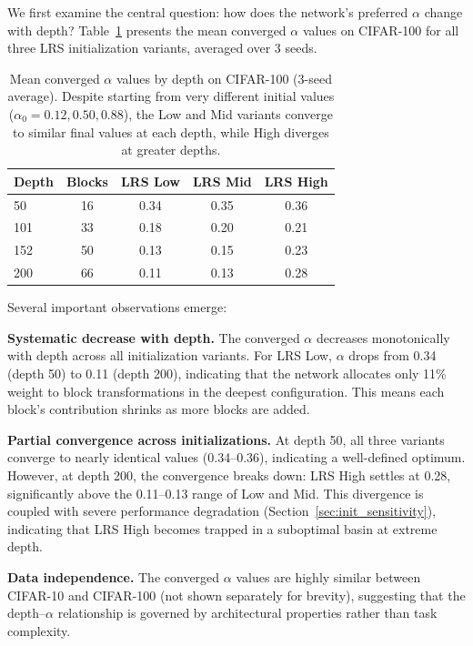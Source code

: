 \documentclass[preprint,12pt]{elsarticle}
\begin{document}
We first examine the central question: how does the network's preferred $\alpha$ change with depth? Table~\ref{tab:depth_alpha} presents the mean converged $\alpha$ values on CIFAR-100 for all three LRS initialization variants, averaged over 3 seeds.

\begin{table}[t]
\centering
\caption{Mean converged $\alpha$ values by depth on CIFAR-100 (3-seed average). Despite starting from very different initial values ($\alpha_0 = 0.12, 0.50, 0.88$), the Low and Mid variants converge to similar final values at each depth, while High diverges at greater depths.}
\label{tab:depth_alpha}
\begin{tabular}{lcccc}
\toprule
\textbf{Depth} & \textbf{Blocks} & \textbf{LRS Low} & \textbf{LRS Mid} & \textbf{LRS High} \\
\midrule
50  & 16 & 0.34 & 0.35 & 0.36 \\
101 & 33 & 0.18 & 0.20 & 0.21 \\
152 & 50 & 0.13 & 0.15 & 0.23 \\
200 & 66 & 0.11 & 0.13 & 0.28 \\
\bottomrule
\end{tabular}
\end{table}

Several important observations emerge:

\textbf{Systematic decrease with depth.} The converged $\alpha$ decreases monotonically with depth across all initialization variants. For LRS Low, $\alpha$ drops from 0.34 (depth 50) to 0.11 (depth 200), indicating that the network allocates only 11\% weight to block transformations in the deepest configuration. This means each block's contribution shrinks as more blocks are added.

\textbf{Partial convergence across initializations.} At depth 50, all three variants converge to nearly identical values (0.34--0.36), indicating a well-defined optimum. However, at depth 200, the convergence breaks down: LRS High settles at 0.28, significantly above the 0.11--0.13 range of Low and Mid. This divergence is coupled with severe performance degradation (Section~\ref{sec:init_sensitivity}), indicating that LRS High becomes trapped in a suboptimal basin at extreme depth.

\textbf{Data independence.} The converged $\alpha$ values are highly similar between CIFAR-10 and CIFAR-100 (not shown separately for brevity), suggesting that the depth--$\alpha$ relationship is governed by architectural properties rather than task complexity.
\end{document}
